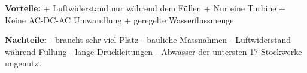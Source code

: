 \bigskip

\textbf{Vorteile:} 									\newline
+	Luftwiderstand nur während dem Füllen			\newline
+	Nur eine Turbine									\newline
+	Keine AC-DC-AC Umwandlung						\newline
+	geregelte Wasserflussmenge						\newline

\textbf{Nachteile:}									\newline
-	braucht sehr viel Platz 							\newline
-	bauliche Massnahmen								\newline
-	Luftwiderstand während Füllung					\newline
- 	lange Druckleitungen								\newline
-	Abwasser der untersten 17 Stockwerke ungenutzt	\newline
\WFclear